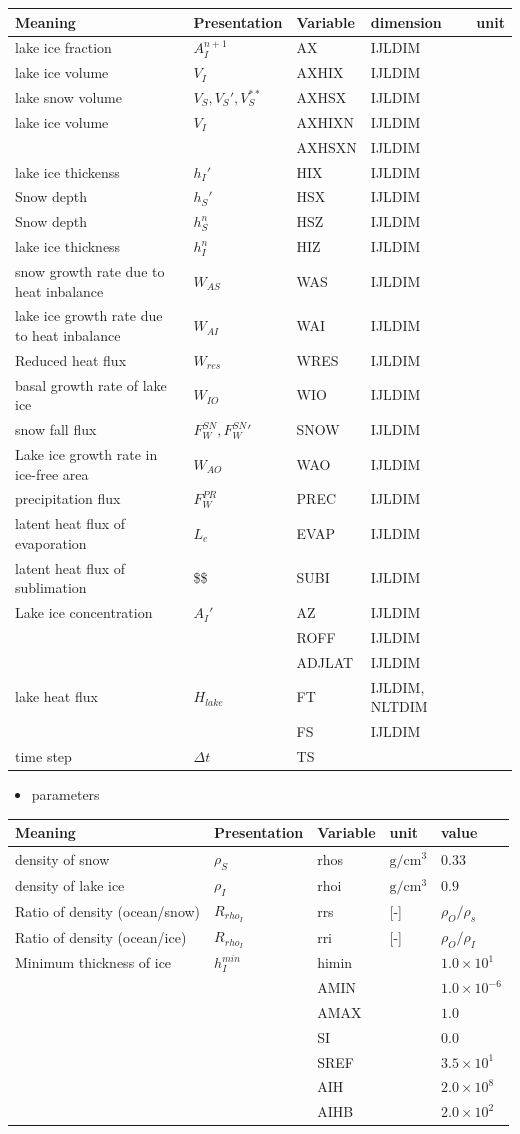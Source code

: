 \setlength\LTleft{0pt}\setlength\LTright{0pt}\begin{longtable}[]{@{}lllll@{}}
\toprule\relax
Meaning & Presentation & Variable & dimension & unit\tabularnewline
\midrule\relax
\endhead
lake ice fraction & \(A_I^{n+1}\) & AX & IJLDIM &\tabularnewline
lake ice volume & \(V_I\) & AXHIX & IJLDIM &\tabularnewline
lake snow volume & \(V_S, V_S', V_S^{**}\) & AXHSX & IJLDIM
&\tabularnewline
lake ice volume & \(V_I\) & AXHIXN & IJLDIM &\tabularnewline
& & AXHSXN & IJLDIM &\tabularnewline
lake ice thickenss & \(h_I'\) & HIX & IJLDIM &\tabularnewline
Snow depth & \(h_S'\) & HSX & IJLDIM &\tabularnewline
Snow depth & \(h_S^n\) & HSZ & IJLDIM &\tabularnewline
lake ice thickness & \(h_I^n\) & HIZ & IJLDIM &\tabularnewline
snow growth rate due to heat inbalance & \(W_{AS}\) & WAS & IJLDIM
&\tabularnewline
lake ice growth rate due to heat inbalance & \(W_{AI}\) & WAI & IJLDIM
&\tabularnewline
Reduced heat flux & \(W_{res}\) & WRES & IJLDIM &\tabularnewline
basal growth rate of lake ice & \(W_{IO}\) & WIO & IJLDIM
&\tabularnewline
snow fall flux & \(F_W^{SN}, {F_W^{SN}}'\) & SNOW & IJLDIM
&\tabularnewline
Lake ice growth rate in ice-free area & \(W_{AO}\) & WAO & IJLDIM
&\tabularnewline
precipitation flux & \(F_W^{PR}\) & PREC & IJLDIM &\tabularnewline
latent heat flux of evaporation & \(L_e\) & EVAP & IJLDIM
&\tabularnewline
latent heat flux of sublimation & \$\$ & SUBI & IJLDIM &\tabularnewline
Lake ice concentration & \(A_I'\) & AZ & IJLDIM &\tabularnewline
& & ROFF & IJLDIM &\tabularnewline
& & ADJLAT & IJLDIM &\tabularnewline
lake heat flux & \(H_{lake}\) & FT & IJLDIM, NLTDIM &\tabularnewline
& & FS & IJLDIM &\tabularnewline
time step & \(\Delta t\) & TS & &\tabularnewline
\bottomrule
\end{longtable}

\begin{itemize}
\tightlist
\item
  parameters
\end{itemize}

\setlength\LTleft{0pt}\setlength\LTright{0pt}\begin{longtable}[]{@{}lllll@{}}
\toprule\relax
Meaning & Presentation & Variable & unit & value\tabularnewline
\midrule\relax
\endhead
density of snow & \(\rho_S\) & rhos & \(\mathrm{g/cm^3}\) &
\(0.33\)\tabularnewline
density of lake ice & \(\rho_I\) & rhoi & \(\mathrm{g/cm^3}\) &
\(0.9\)\tabularnewline
Ratio of density (ocean/snow) & \(R_{rho_I}\) & rrs & {[}-{]} &
\(\rho_O/\rho_s\)\tabularnewline
Ratio of density (ocean/ice) & \(R_{rho_I}\) & rri & {[}-{]} &
\(\rho_O/\rho_I\)\tabularnewline
Minimum thickness of ice & \(h_I^{min}\) & himin & &
\(1.0\times 10^1\)\tabularnewline
& & AMIN & & \(1.0\times 10^{-6}\)\tabularnewline
& & AMAX & & \(1.0\)\tabularnewline
& & SI & & \(0.0\)\tabularnewline
& & SREF & & \(3.5\times 10^1\)\tabularnewline
& & AIH & & \(2.0\times 10^8\)\tabularnewline
& & AIHB & & \(2.0\times 10^2\)\tabularnewline
\bottomrule
\end{longtable}

